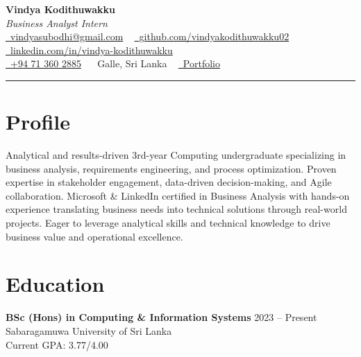 \documentclass[letterpaper,10.8pt]{article}
\begin{document}
\fontsize{10.5}{12}\selectfont

\begin{center}
{\Huge\color{accentTitle}\textbf{Vindya Kodithuwakku}}\\[3pt]
{\large\textit{Business Analyst Intern}}\\[4pt]
\href{mailto:vindyasubodhi@gmail.com}{\faEnvelope~vindyasubodhi@gmail.com} ~
\href{https://github.com/vindyakodithuwakku02}{\faGithub~github.com/vindyakodithuwakku02} ~
\href{https://www.linkedin.com/in/vindya-kodithuwakku-bb6187202}{\faLinkedin~linkedin.com/in/vindya-kodithuwakku}\\[2pt]
\href{tel:+94713602885}{\faPhone~+94 71 360 2885} ~
\faMapMarker*~Galle, Sri Lanka ~
\href{https://vindyakodithuwakku02.github.io/my_portfolio/}{\faGlobe~Portfolio}\\[4pt]
{\color{accentLine}\hrule}
\end{center}

\vspace{-20pt}
\section{Profile}
\vspace{-2pt}
\justifying
Analytical and results-driven 3rd-year Computing undergraduate specializing in business analysis, requirements engineering, and process optimization. Proven expertise in stakeholder engagement, data-driven decision-making, and Agile collaboration. Microsoft \& LinkedIn certified in Business Analysis with hands-on experience translating business needs into technical solutions through real-world projects. Eager to leverage analytical skills and technical knowledge to drive business value and operational excellence.

\section{Education}
\vspace{-1pt}

\noindent\textbf{BSc (Hons) in Computing \& Information Systems} \hfill 2023 – Present\\
\noindent Sabaragamuwa University of Sri Lanka\\
\noindent Current GPA: 3.77/4.00
\end{document}
